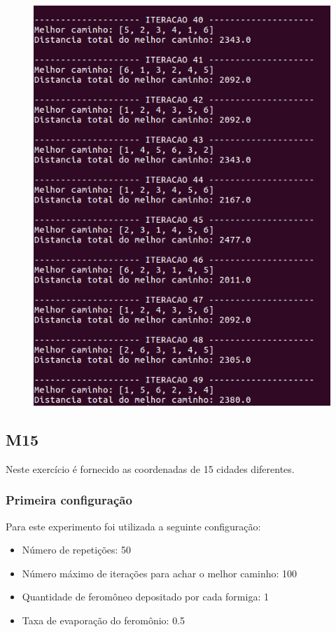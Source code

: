 \documentclass[hidelinks,12pt]{article}
\begin{document}
		\begin{figure}[!h]
			\centering
			\includegraphics[scale=0.6]{Figures/m6-2-5.png}
		\end{figure}

		\newpage

	
	\subsection{M15}
			Neste exercício é fornecido as coordenadas de 15 cidades diferentes.	
		\subsubsection{Primeira configuração}
		 	Para este experimento foi utilizada a seguinte configuração:

		 	\begin{itemize}
				\item Número de repetições: 50
				\item Número máximo de iterações para achar o melhor caminho: 100
				\item Quantidade de feromôneo depositado por cada formiga: 1
				\item Taxa de evaporação do feromônio: 0.5
			\end{itemize}
\end{document}
